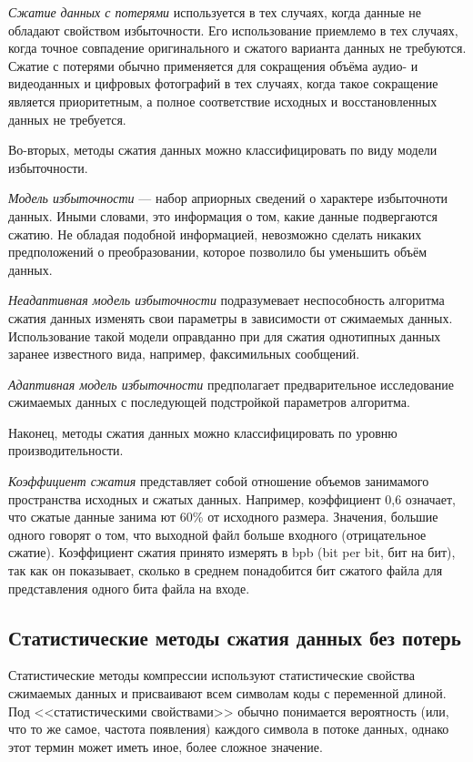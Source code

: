 \textit{Сжатие данных с потерями} используется в тех случаях,
когда данные не обладают свойством избыточности. Его использование
приемлемо в тех случаях, когда точное совпадение оригинального и сжатого
варианта данных не требуются.
Сжатие с потерями обычно применяется для сокращения объёма аудио- и видеоданных
и цифровых фотографий в тех случаях, когда такое сокращение является
приоритетным, а полное соответствие исходных и восстановленных данных
не требуется.

Во-вторых, методы сжатия данных можно классифицировать 
по виду модели избыточности.

\textit{Модель избыточности} --- набор априорных сведений о характере
избыточноти данных. Иными словами, это информация о том, какие данные
подвергаются сжатию. Не обладая подобной информацией, 
невозможно сделать никаких предположений о преобразовании, 
которое позволило бы уменьшить объём данных.

\textit{Неадаптивная модель избыточности} подразумевает неспособность 
алгоритма сжатия данных изменять свои параметры в зависимости 
от сжимаемых данных. Использование такой модели оправданно 
при для сжатия однотипных данных заранее известного вида, 
например, факсимильных сообщений.

\textit{Адаптивная модель избыточности} предполагает предварительное 
исследование сжимаемых данных с последующей подстройкой параметров алгоритма.

Наконец, методы сжатия данных можно классифицировать 
по уровню производительности.

\textit{Коэффициент сжатия} представляет собой отношение объемов
занимамого пространства исходных и сжатых данных.
Например, коэффициент 0{,}6 означает, что сжатые данные занима­
ют 60\% от исходного размера. Значения, большие одного говорят о том,
что выходной файл больше входного (отрицательное сжатие).
Коэффициент сжатия принято измерять в bpb (bit per bit, бит на бит),
так как он показывает, сколько в среднем понадобится бит сжатого файла
для представления одного бита файла на входе. 

\subsection{Статистические методы сжатия данных без потерь}
\label{ssec:statistical_methods}

Статистические методы компрессии используют статистические свойства
сжимаемых данных и присваивают всем символам коды с переменной длиной.
Под <<статистическими свойствами>> обычно понимается вероятность 
(или, что то же самое, частота появления) каждого символа в потоке данных,
однако этот термин может иметь иное, более сложное значение.

